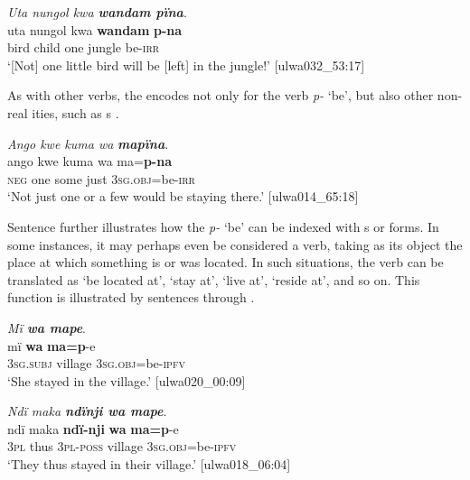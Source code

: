 \ea%
    \label{ex:pred:3}
            \textit{Uta nungol kwa \textbf{wandam pïna}}.\\
\gll uta    nungol  kwa  \textbf{wandam}  \textbf{p-na}\\
    bird  child  one    jungle    be-\textsc{irr}\\
\glt `[Not] one little bird will be [left] in the jungle!’ [ulwa032\_53:17]
\z

As with other verbs, the   encodes not only   for the verb \textit{p-} ‘be’, but also other non-real ities, such as s .

\ea%
    \label{ex:pred:4}
            \textit{Ango kwe kuma wa} \textbf{\textit{mapïna}}.\\
\gll ango  kwe  kuma  wa    ma=\textbf{p-na}\\
    \textsc{neg}  one    some  just    3\textsc{sg.obj}=be-\textsc{irr}\\
\glt `Not just one or a few would be staying there.’ [ulwa014\_65:18]
\z

Sentence  further illustrates how the  \textit{p-} ‘be’ can be indexed with  s or  forms. In some instances, it may perhaps even be considered a  verb, taking as its object the place at which something is or was located. In such situations, the verb can be translated as ‘be located at’, ‘stay at’, ‘live at’, ‘reside at’, and so on. This function is illustrated by sentences  through .


\ea%
    \label{ex:pred:5}
            \textit{Mï \textbf{wa mape}}.\\
\gll mï      \textbf{wa}    \textbf{ma=p}-e\\
    3\textsc{sg.subj}  village  3\textsc{sg.obj}=be-\textsc{ipfv}\\
\glt `She stayed in the village.’ [ulwa020\_00:09]
\z

\ea%
    \label{ex:pred:6}
            \textit{Ndï maka \textbf{ndïnji wa mape}}.\\
\gll ndï  maka  \textbf{ndï-nji}    \textbf{wa}    \textbf{ma=p}-e\\
    3\textsc{pl}  thus  3\textsc{pl-poss}  village  3\textsc{sg.obj}=be-\textsc{ipfv}\\
\glt `They thus stayed in their village.’ [ulwa018\_06:04]
\z

